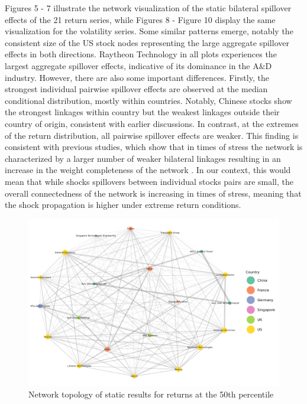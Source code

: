 \documentclass[
  number]{elsarticle}
\begin{document}
Figures 5 - 7 illustrate the network visualization of the static
bilateral spillover effects of the 21 return series, while Figures 8 -
Figure 10 display the same visualization for the volatility series. Some
similar patterns emerge, notably the consistent size of the US stock
nodes representing the large aggregate spillover effects in both
directions. Raytheon Technology in all plots experiences the largest
aggregate spillover effects, indicative of its dominance in the A\&D
industry. However, there are also some important differences. Firstly,
the strongest individual pairwise spillover effects are observed at the
median conditional distribution, mostly within countries. Notably,
Chinese stocks show the strongest linkages within country but the
weakest linkages outside their country of origin, consistent with
earlier discussions. In contrast, at the extremes of the return
distribution, all pairwise spillover effects are weaker. This finding is
consistent with previous studies, which show that in times of stress the
network is characterized by a larger number of weaker bilateral linkages
resulting in an increase in the weight completeness of the network
\citep{Dungey.2019, Ando.2022}. In our context, this would mean that
while shocks spillovers between individual stocks pairs are small, the
overall connectedness of the network is increasing in times of stress,
meaning that the shock propagation is higher under extreme return
conditions.

\begin{figure}[H]

{\centering \includegraphics[width=6.75in,height=\textheight]{plots/fig-rtn50.png}

}

\caption{\label{fig-rtn50}Network topology of static results for returns
at the 50th percentile}

\end{figure}
\end{document}

